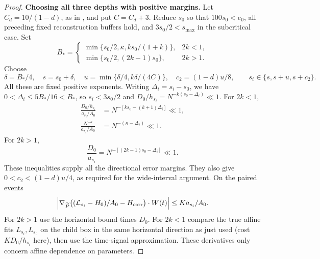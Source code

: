\begin{proof}
\par\smallskip\noindent\textbf{Choosing all three depths with positive margins.}\quad
Let \(C_d=10/(1-d)\), as in , and put
\(C=C_d+3\).  Reduce \(s_0\) so that \(100s_0<e_0\), all
preceding fixed reconstruction buffers hold, and
\(3s_0/2<s_{\max}\) in the subcritical case.  Set
\[
 B_*=
 \begin{cases}
 \min\{s_0/2,\kappa,ks_0/(1+k)\},&2k<1,\\
 \min\{s_0/2,(2k-1)s_0\},&2k>1.
 \end{cases}
\]
Choose
\[
 \delta=B_*/4,\quad s=s_0+\delta,\quad
 u=\min\{\delta/4,k\delta/(4C)\},\quad
 c_2=(1-d)u/8,
 \qquad s_i\in\{s,s+u,s+c_2\}.
\]
All these are fixed positive exponents.  Writing
\(\Delta_i=s_i-s_0\), we have
\(0<\Delta_i\le5B_*/16<B_*\), so \(s_i<3s_0/2\) and
\(D_0/h_{s_i}=N^{-k(s_0-\Delta_i)}\ll1\).  For \(2k<1\),
\begin{align*}
 \frac{D_0/h_{s_i}}{a_{s_i}/A_0}
 &=N^{-[ks_0-(k+1)\Delta_i]}\ll1,\\
 \frac{N^{-\kappa}}{a_{s_i}/A_0}
 &=N^{-(\kappa-\Delta_i)}\ll1.
\end{align*}
For \(2k>1\),
\[
 \frac{D_0}{a_{s_i}}
   =N^{-[(2k-1)s_0-\Delta_i]}\ll1.
\]
These inequalities supply all the directional error margins.  They
also give \(0<c_2<(1-d)u/4\), as required for the wide-interval
argument. On the paired events
\begin{equation}
 \left|\nabla_{\widetilde P}\big(({\cal L}_{s_i}-H_0)/A_0-H_{\rm corr}\big)\cdot W(t)\right|
          \le K a_{s_i}/A_0 .                                       \label{a07:directional-collapse}
\end{equation}
For \(2k>1\) use the horizontal bound  times \(D_0\). For \(2k<1\) compare the true affine fits \(L_{s_i},L_{s_0}\) on the child box in the same horizontal direction as just used (cost \(K D_0/h_{s_i}\) here), then use the time-signal approximation. These derivatives only concern affine dependence on parameters.


\end{proof}
